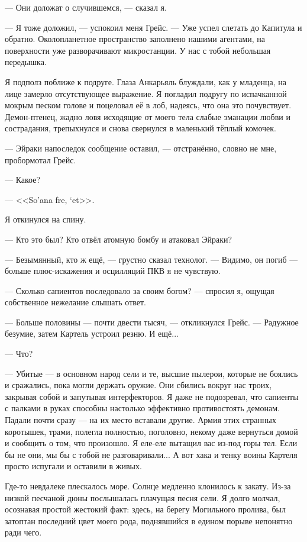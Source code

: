 --- Они доложат о случившемся, --- сказал я.

--- Я тоже доложил, --- успокоил меня Грейс.
--- Уже успел слетать до Капитула и обратно.
Околопланетное пространство заполнено нашими агентами, на поверхности уже разворачивают микростанции.
У нас с тобой небольшая передышка.

Я подполз поближе к подруге.
Глаза Анкарьяль блуждали, как у младенца, на лице замерло отсутствующее выражение.
Я погладил подругу по испачканной мокрым песком голове и поцеловал её в лоб, надеясь, что она это почувствует.
Демон-птенец, жадно ловя исходящие от моего тела слабые эманации любви и сострадания, трепыхнулся и снова свернулся в маленький тёплый комочек.

--- Эйраки напоследок сообщение оставил, --- отстранённо, словно не мне, пробормотал Грейс.

--- Какое?

--- <<So’ana fre, ‘et>>\FM.

Я откинулся на спину.

--- Кто это был?
Кто отвёл атомную бомбу и атаковал Эйраки?

--- Безымянный, кто ж ещё, --- грустно сказал технолог.
--- Видимо, он погиб --- больше плюс-искажения и осцилляций ПКВ я не чувствую.

--- Сколько сапиентов последовало за своим богом? --- спросил я, ощущая собственное нежелание слышать ответ.

--- Больше половины --- почти двести тысяч, --- откликнулся Грейс.
--- Радужное безумие, затем Картель устроил резню.
И ещё...

--- Что?

--- Убитые --- в основном народ сели и те, высшие пылерои, которые не боялись и сражались, пока могли держать оружие.
Они сбились вокруг нас троих, закрывая собой и запутывая интерфекторов.
Я даже не подозревал, что сапиенты с палками в руках способны настолько эффективно противостоять демонам.
Падали почти сразу --- на их место вставали другие.
Армия этих странных коротышек, трами, полегла полностью, поголовно, некому даже вернуться домой и сообщить о том, что произошло.
Я еле-еле вытащил вас из-под горы тел.
Если бы не они, мы бы с тобой не разговаривали...
А вот хака и тенку воины Картеля просто испугали и оставили в живых.

Где-то невдалеке плескалось море.
Солнце медленно клонилось к закату.
Из-за низкой песчаной дюны послышалась плачущая песня сели.
Я долго молчал, осознавая простой жестокий факт: здесь, на берегу Могильного пролива, был затоптан последний цвет моего рода, поднявшийся в едином порыве непонятно ради чего.

